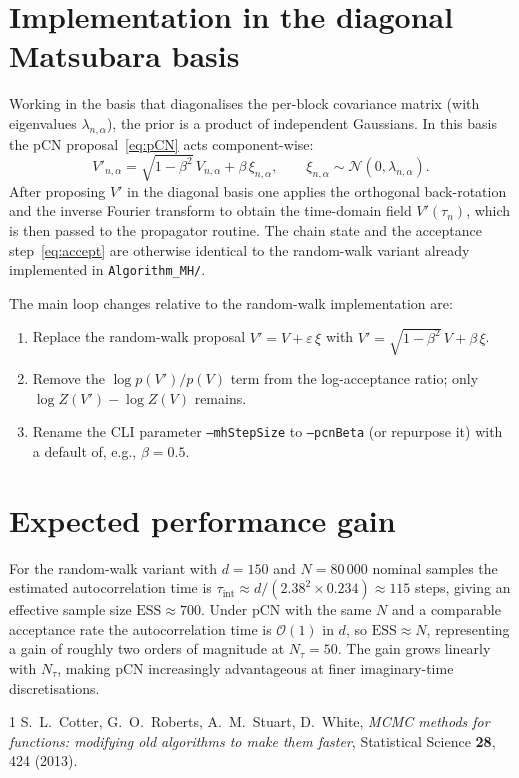 \documentclass[11pt]{article}
\newcommand{\calN}{\mathcal{N}}
\newcommand{\calO}{\mathcal{O}}
\begin{document}
\section{Implementation in the diagonal Matsubara basis}

Working in the basis that diagonalises the per-block covariance matrix (with
eigenvalues $\lambda_{n,\alpha}$), the prior is a product of independent
Gaussians.  In this basis the pCN proposal~\eqref{eq:pCN} acts component-wise:
\begin{equation}
    V'_{n,\alpha}
    = \sqrt{1-\beta^2}\,V_{n,\alpha}
      + \beta\,\xi_{n,\alpha},
    \qquad
    \xi_{n,\alpha} \sim \calN(0,\lambda_{n,\alpha}).
\end{equation}
After proposing $V'$ in the diagonal basis one applies the orthogonal
back-rotation and the inverse Fourier transform to obtain the time-domain field
$V'(\tau_n)$, which is then passed to the propagator routine.  The chain state
and the acceptance step~\eqref{eq:accept} are otherwise identical to the
random-walk variant already implemented in \texttt{Algorithm\_MH/}.

The main loop changes relative to the random-walk implementation are:
\begin{enumerate}
    \item Replace the random-walk proposal
    $V' = V + \varepsilon\,\xi$ with $V' = \sqrt{1-\beta^2}\,V + \beta\,\xi$.
    \item Remove the $\log p(V')/p(V)$ term from the log-acceptance ratio;
    only $\log Z(V') - \log Z(V)$ remains.
    \item Rename the CLI parameter \texttt{--mhStepSize} to \texttt{--pcnBeta}
    (or repurpose it) with a default of, e.g., $\beta = 0.5$.
\end{enumerate}

\section{Expected performance gain}

For the random-walk variant with $d = 150$ and $N = 80\,000$ nominal samples
the estimated autocorrelation time is $\tau_{\mathrm{int}} \approx d / (2.38^2
\times 0.234) \approx 115$ steps, giving an effective sample size
$\mathrm{ESS} \approx 700$.  Under pCN with the same $N$ and a comparable
acceptance rate the autocorrelation time is $\calO(1)$ in $d$, so
$\mathrm{ESS} \approx N$, representing a gain of roughly two orders of magnitude
at $N_\tau = 50$.  The gain grows linearly with $N_\tau$, making pCN
increasingly advantageous at finer imaginary-time discretisations.

\begin{thebibliography}{1}
S.~L.~Cotter, G.~O.~Roberts, A.~M.~Stuart, D.~White,
\textit{MCMC methods for functions: modifying old algorithms to make them faster},
Statistical Science \textbf{28}, 424 (2013).
\end{thebibliography}
\end{document}
